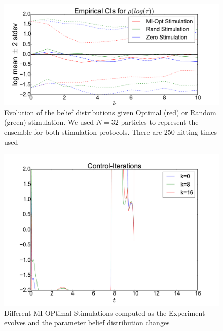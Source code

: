 \begin{figure}[htp]
\begin{center}
  \includegraphics[width=\textwidth]{Figs/HTOnlineEstimator/single_experiment_example_ensemble_distn_evolution.pdf}
  \caption[labelInTOC]{Evolution of the belief distributions given Optimal
  (red) or Random (green) stimulation. We used $N=32$ particles to represent
  the ensemble for both stimulation protocols. There are 250 hitting times used}
  \label{fig:example_miopt_vs_rand_ensemble_evolution}
\end{center}
\end{figure}
\begin{figure}[htp]
\begin{center}
  \includegraphics[width=\textwidth]{Figs/HTOnlineEstimator/single_experiment_example_controls_evolution.pdf}
  \caption[labelInTOC]{Different MI-OPtimal Stimulations computed 
  as the Experiment evolves and the parameter belief distribution changes}
  \label{fig:example_miopt_controls_evolution}
\end{center}
\end{figure}
 

